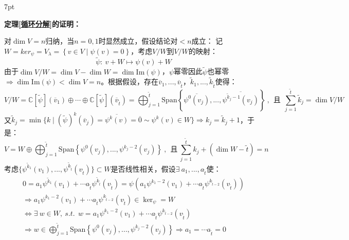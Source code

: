 \documentclass[zihao=5,UTF8]{report}
\theoremstyle{mystyle} %
\newenvironment{graybox}{%
\def\FrameCommand{%
\hspace{1pt}%
{\color{gray}\small \vrule width 2pt}%
{\color{graybox_color}\vrule width 4pt}%
\colorbox{graybox_color}%
}%
\MakeFramed{\advance\hsize-\width\FrameRestore}%
\noindent\hspace{-4.55pt}%
\begin{adjustwidth}{}{7pt}%
\vspace{2pt}\vspace{2pt}%
}
{%
\vspace{2pt}\end{adjustwidth}\endMakeFramed%
}
\begin{document}
\begin{graybox}
\textbf{定理\ref{循环分解}的证明：}\par\noindent
对$\dim V = n$归纳，当$n = 0,1$时显然成立，假设结论对$<n$成立：
记$W = ker_{\psi} = V_{\lambda} = \left\{v \in V\mid \psi(v)=0 \right\}$，考虑$V/W$到$V/W$的映射：
\begin{equation*}
    \tilde{\psi}:\ v + W \longmapsto \psi(v) + W
\end{equation*}
由于$\dim V/W = \dim V - \dim W = \dim \text{Im} (\psi) $，$\psi$幂零因此$\tilde{\psi}$也幂零$\Longrightarrow \dim \text{Im}(\psi) < \dim V = n$。根据假设，存在$\overline{v}_1,...,\overline{v}_{\tilde{t}}$，$\tilde{k}_1,...,\tilde{k}_{\tilde{t}}$使得：
\begin{equation*}
    V/W = \mathbb{C}[\tilde{\psi}](\overline{v}_1) \oplus \cdots \oplus \mathbb{C}[\tilde{\psi}](\overline{v}_{\tilde{t}}) = \bigoplus_{j =1}^{\tilde{t}} \text{Span}\left\{ \overline{\psi^0(v_j)},...,\overline{\psi^{\tilde{k}_j-1}(v_j)}\right\} \ ,\ \ \text{且}\ \ \sum_{j=1}^{\tilde{t}}\tilde{k}_j = \dim V/W 
\end{equation*}
又$\tilde{k}_j= \min \{ k\mid (\tilde{\psi})^k(\overline{v}_j) = \overline{\psi^k(v)} =\overline{0} \sim \psi^k(v) \in W\} \Longrightarrow k_j = \tilde{k}_j +1$，于是：
\begin{equation*}
    V = W \oplus \bigoplus_{j =1}^{\tilde{t}} \text{Span}\left\{ \psi^0(v_j),...,\psi^{k_j-2}(v_j)\right\}\ ,\ \ \text{且}\ \sum_{j=1}^{\tilde{t}}k_j + (\dim W - \tilde{t}) = n
\end{equation*}
考虑$\{\psi^{\tilde{k}_1}(v_1),...,\psi^{\tilde{k}_{\tilde{t}}}(v_{\tilde{t}})\} \subset W$是否线性相关，假设$\exists\  a_1,...,a_{\tilde{t}}$使：
\begin{gather*}
    0 = a_1\psi^{\tilde{k}_1}(v_1) + \cdots a_{\tilde{t}}\psi^{\tilde{k}_{\tilde{t}}}(v_{\tilde{t}}) = \psi \left( a_1\psi^{k_1-2}(v_1) + \cdots a_{\tilde{t}}\psi^{k_{\tilde{t}-2}}(v_{\tilde{t}})\right)\\
     \Longrightarrow 
      a_1\psi^{k_1-2}(v_1) + \cdots a_{\tilde{t}}\psi^{k_{\tilde{t}-2}}(v_{\tilde{t}}) \in \ker_{\psi} = W \\
     \Longleftrightarrow 
     \exists\   w \in W , \ s.t.\ \   w =  a_1\psi^{k_1-2}(v_1) + \cdots a_{\tilde{t}}\psi^{k_{\tilde{t}-2}}(v_{\tilde{t}})\\
     \Longrightarrow  
     w \in \bigoplus_{j =1}^{\tilde{t}} \text{Span}\left\{ \psi^0(v_j),...,\psi^{k_j-2}(v_j)\right\} 
     \Longrightarrow a_1 = \cdots a_{\tilde{t}} = 0
\end{gather*}

\end{graybox}
\end{document}
